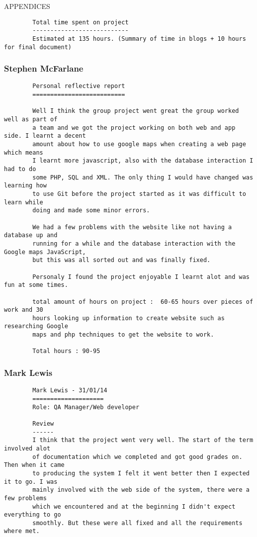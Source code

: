 \documentclass{article}
\begin{document}
\begin{section}{APPENDICES}
\begin{verbatim}
		Total time spent on project
		---------------------------
		Estimated at 135 hours. (Summary of time in blogs + 10 hours for final document)
		\end{verbatim}
		
		\clearpage
		\subsubsection{Stephen McFarlane}
		
		\begin{verbatim}
		Personal reflective report
		==========================
		
		Well I think the group project went great the group worked well as part of
		a team and we got the project working on both web and app side. I learnt a decent
		amount about how to use google maps when creating a web page which means
		I learnt more javascript, also with the database interaction I had to do
		some PHP, SQL and XML. The only thing I would have changed was learning how
		to use Git before the project started as it was difficult to learn while 
		doing and made some minor errors.

		We had a few problems with the website like not having a database up and 
		running for a while and the database interaction with the Google maps JavaScript, 
		but this was all sorted out and was finally fixed.

		Personaly I found the project enjoyable I learnt alot and was fun at some times. 

		total amount of hours on project :  60-65 hours over pieces of work and 30 
		hours looking up information to create website such as researching Google 
		maps and php techniques to get the website to work.

		Total hours : 90-95
		\end{verbatim}
		
		\clearpage
		\subsubsection{Mark Lewis}
		\begin{verbatim}
		Mark Lewis - 31/01/14
		====================
		Role: QA Manager/Web developer

		Review
		------
		I think that the project went very well. The start of the term involved alot 
		of documentation which we completed and got good grades on. Then when it came 
		to producing the system I felt it went better then I expected it to go. I was 
		mainly involved with the web side of the system, there were a few problems 
		which we encountered and at the beginning I didn't expect everything to go 
		smoothly. But these were all fixed and all the requirements where met.
		

\end{verbatim}
\end{section}
\end{document}
